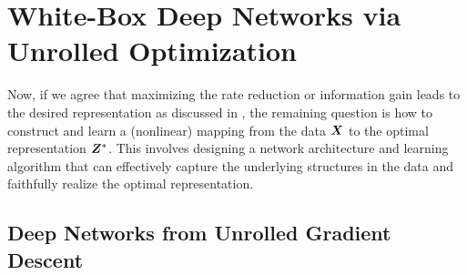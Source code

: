 \documentclass[../../book-main.tex]{subfiles}
\begin{document}




\section{White-Box Deep Networks via Unrolled Optimization}\label{sec:chap4-white-box-model-via-unrolling}


Now, if we agree that maximizing the rate reduction or information gain leads to the desired representation as discussed in , the remaining question is how to construct and learn a (nonlinear) mapping from the data $\bm{X}$ to the optimal representation $\bm{Z}^*$. This involves designing a network architecture and learning algorithm that can effectively capture the underlying structures in the data and faithfully realize the optimal representation. 


\subsection{Deep Networks from Unrolled Gradient Descent}
\end{document}
